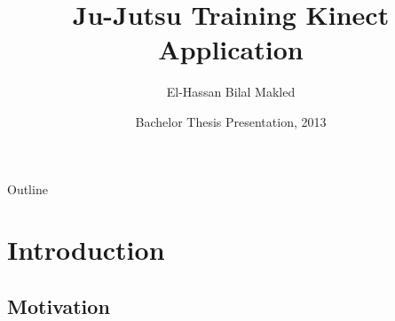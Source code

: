 \documentclass{beamer}
\title[Ju-Jutsu Training Kinect Application] %
{Ju-Jutsu Training Kinect Application}
\author[El-Hassan Bilal Makled] %
{El-Hassan Bilal Makled}
\institute[German University in Cairo] %
{
  Faculty of Media Engineering and Technology\\
  German University in Cairo
  }
\date[2013] %
{Bachelor Thesis Presentation, 2013}
\begin{document}
\begin{frame}
  \titlepage
\end{frame}

\begin{frame}{Outline}
  \tableofcontents
\end{frame}





\section{Introduction}

\subsection{Motivation}
\end{document}
